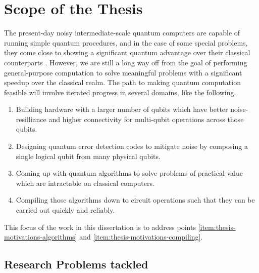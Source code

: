 \section{Scope of the Thesis}

The present-day noisy intermediate-scale quantum computers are capable of running simple quantum procedures, and in the case of some special problems, they come close to showing a significant quantum advantage over their classical counterparts \cite{google-quantum-supremacy}. However, we are still a long way off from the goal of performing general-purpose computation to solve meaningful problems with a significant speedup over the classical realm. The path to making quantum computation feasible will involve iterated progress in several domains, like the following. 
\begin{enumerate}
    \item Building hardware with a larger number of qubits which have better noise-resilliance and higher connectivity for multi-qubit operations across those qubits. 
    \item Designing quantum error detection codes to mitigate noise by composing a single logical qubit from many physical qubits.
    \item \label{item:thesis-motivations-algorithms} Coming up with quantum algorithms to solve problems of practical value which are intractable on classical computers.
    \item \label{item:thesis-motivations-compiling} Compiling those algorithms down to circuit operations such that they can be carried out quickly and reliably.
\end{enumerate}

This focus of the work in this dissertation is to address points \ref{item:thesis-motivations-algorithms} and \ref{item:thesis-motivations-compiling}.

\subsection{Research Problems tackled}

